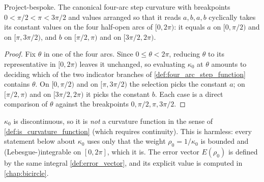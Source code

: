 \begin{lemma}
  \label{lem:step_curvature_canonical_values}
  Project-bespoke. The canonical four-arc step curvature with breakpoints
  $0 < \pi/2 < \pi < 3\pi/2$ and values arranged so that it reads $a, b, a, b$
  cyclically takes its constant values on the four half-open arcs of $[0,2\pi)$:
  it equals $a$ on $[0,\pi/2)$ and on $[\pi,3\pi/2)$, and $b$ on $[\pi/2,\pi)$ and
  on $[3\pi/2,2\pi)$.
\end{lemma}
\begin{proof}
  \leanok
  Fix $\theta$ in one of the four arcs. Since $0\le\theta<2\pi$, reducing $\theta$
  to its representative in $[0,2\pi)$ leaves it unchanged, so evaluating
  $\kappa_0$ at $\theta$ amounts to deciding which of the two indicator branches
  of \cref{def:four_arc_step_function} contains $\theta$. On $[0,\pi/2)$ and on
  $[\pi,3\pi/2)$ the selection picks the constant $a$; on $[\pi/2,\pi)$ and on
  $[3\pi/2,2\pi)$ it picks the constant $b$. Each case is a direct comparison of
  $\theta$ against the breakpoints $0,\pi/2,\pi,3\pi/2$.
\end{proof}

\begin{remark}
  $\kappa_0$ is discontinuous, so it is \emph{not} a curvature function in the
  sense of \cref{def:is_curvature_function} (which requires continuity). This is
  harmless: every statement below about $\kappa_0$ uses only that the weight
  $\rho_0 = 1/\kappa_0$ is bounded and (Lebesgue-)integrable on $[0,2\pi]$, which
  it is. The error vector $E(\rho_0)$ is defined by the same integral
  \cref{def:error_vector}, and its explicit value is computed in
  \cref{chap:bicircle}.
\end{remark}

